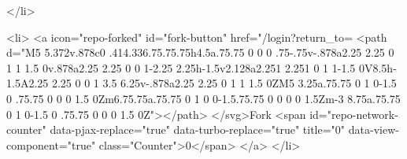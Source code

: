  </li>

  <li>
          <a icon="repo-forked" id="fork-button" href="/login?return_to=%
    <path d="M5 5.372v.878c0 .414.336.75.75.75h4.5a.75.75 0 0 0 .75-.75v-.878a2.25 2.25 0 1 1 1.5 0v.878a2.25 2.25 0 0 1-2.25 2.25h-1.5v2.128a2.251 2.251 0 1 1-1.5 0V8.5h-1.5A2.25 2.25 0 0 1 3.5 6.25v-.878a2.25 2.25 0 1 1 1.5 0ZM5 3.25a.75.75 0 1 0-1.5 0 .75.75 0 0 0 1.5 0Zm6.75.75a.75.75 0 1 0 0-1.5.75.75 0 0 0 0 1.5Zm-3 8.75a.75.75 0 1 0-1.5 0 .75.75 0 0 0 1.5 0Z"></path>
</svg>Fork
    <span id="repo-network-counter" data-pjax-replace="true" data-turbo-replace="true" title="0" data-view-component="true" class="Counter">0</span>
</a>
  </li>


